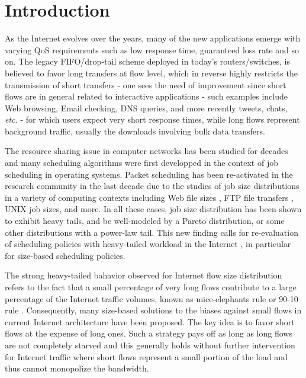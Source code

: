 \documentclass[preprint,12pt]{elsarticle}
\begin{document}
\section{Introduction}
\label{sec:intro}
As the Internet evolves over the years, many of the new applications emerge with varying QoS requirements such as low response time, guaranteed loss rate and so on. The legacy FIFO/drop-tail scheme deployed in today's routers/switches, is believed to favor long transfers at flow level, which in reverse highly restricts the transmission of short transfers - one sees the need of improvement since short flows are in general related to interactive applications - such examples include Web browsing, Email checking, DNS queries, and more recently tweets, chats, \textit{etc.} - for which users expect very short response times, while long flows represent background traffic, usually the downloads involving bulk data transfers. 

The resource sharing issue in computer networks has been studied for decades and many scheduling algorithms were first developped in the context of job scheduling in operating systems. Packet scheduling has been re-activated in the research community in the last decade due to the studies of job size distributions in a variety of computing contexts including Web file sizes \cite{Crovella1997,Barford1998}, FTP file transfers \cite{Rai02fb,Guo2002Scheduling}, UNIX job sizes, and more. In all these cases, job size distribution has been shown to exhibit heavy tails, and be well-modeled by a Pareto distribution, or some other distributions with a power-law tail. This new finding calls for re-evaluation of scheduling policies with heavy-tailed workload in the Internet \cite{WillingerTSW97}, in particular for size-based scheduling policies. 

The strong heavy-tailed bahavior observed for Internet flow size distribution refers to the fact that a small percentage of very long flows contribute to a large percentage of the Internet traffic volumes, known as mice-elephants rule \cite{guo01icnp} or 90-10 rule \cite{Collange08jucs}. Consequently, many size-based solutions to the biases against small flows in current Internet architecture have been proposed. The key idea is to favor short flows at the expense of long ones. Such a strategy pays off as long as long flows are not completely starved and this generally holds without further intervention for Internet traffic where short flows represent a small portion of the load and thus cannot monopolize the bandwidth. 
\end{document}
